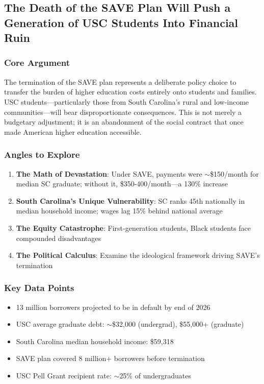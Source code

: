 \documentclass[11pt,letterpaper]{article}
\begin{document}
\newpage
\subsection{The Death of the SAVE Plan Will Push a Generation of USC Students Into Financial Ruin}

\subsubsection*{Core Argument}
The termination of the SAVE plan represents a deliberate policy choice to transfer the burden of higher education costs entirely onto students and families. USC students---particularly those from South Carolina's rural and low-income communities---will bear disproportionate consequences. This is not merely a budgetary adjustment; it is an abandonment of the social contract that once made American higher education accessible.

\subsubsection*{Angles to Explore}
\begin{enumerate}[noitemsep]
    \item \textbf{The Math of Devastation}: Under SAVE, payments were $\sim$\$150/month for median SC graduate; without it, \$350-400/month---a 130\% increase
    \item \textbf{South Carolina's Unique Vulnerability}: SC ranks 45th nationally in median household income; wages lag 15\% behind national average
    \item \textbf{The Equity Catastrophe}: First-generation students, Black students face compounded disadvantages
    \item \textbf{The Political Calculus}: Examine the ideological framework driving SAVE's termination
\end{enumerate}

\subsubsection*{Key Data Points}
\begin{itemize}[noitemsep]
    \item 13 million borrowers projected to be in default by end of 2026
    \item USC average graduate debt: $\sim$\$32,000 (undergrad), \$55,000+ (graduate)
    \item South Carolina median household income: \$59,318
    \item SAVE plan covered 8 million+ borrowers before termination
    \item USC Pell Grant recipient rate: $\sim$25\% of undergraduates
\end{itemize}
\end{document}
